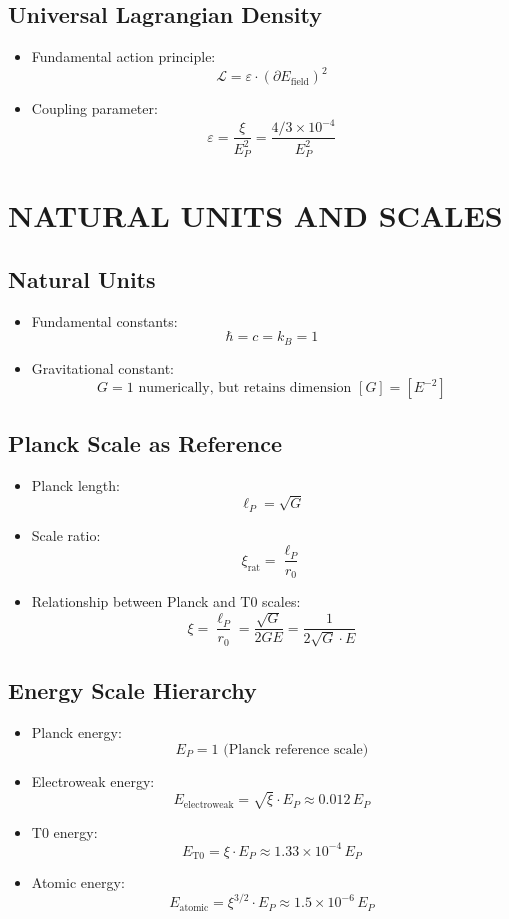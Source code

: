 \documentclass[12pt,a4paper]{article}
\begin{document}
	\subsection{Universal Lagrangian Density}
	\begin{itemize}
		\item Fundamental action principle:
		$$\boxed{\mathcal{L} = \varepsilon \cdot (\partial E_{\text{field}})^2}$$
		
		\item Coupling parameter:
		$$\varepsilon = \frac{\xi}{E_P^2} = \frac{4/3 \times 10^{-4}}{E_P^2}$$
	\end{itemize}
	
	\section{NATURAL UNITS AND SCALES}
	
	\subsection{Natural Units}
	\begin{itemize}
		\item Fundamental constants:
		$$\hbar = c = k_B = 1$$
		
		\item Gravitational constant:
		$$G = 1 \text{ numerically, but retains dimension } [G] = [E^{-2}]$$
	\end{itemize}
	
	\subsection{Planck Scale as Reference}
	\begin{itemize}
		\item Planck length:
		$$\ell_P = \sqrt{G}$$
		
		\item Scale ratio:
		$$\xi_{\text{rat}} = \frac{\ell_P}{r_0}$$
		
		\item Relationship between Planck and T0 scales:
		$$\xi = \frac{\ell_P}{r_0} = \frac{\sqrt{G}}{2GE} = \frac{1}{2\sqrt{G} \cdot E}$$
	\end{itemize}
	
	\subsection{Energy Scale Hierarchy}
	\begin{itemize}
		\item Planck energy:
		$$E_P = 1 \text{ (Planck reference scale)}$$
		
		\item Electroweak energy:
		$$E_{\text{electroweak}} = \sqrt{\xi} \cdot E_P \approx 0.012 \, E_P$$
		
		\item T0 energy:
		$$E_{\text{T0}} = \xi \cdot E_P \approx 1.33 \times 10^{-4} \, E_P$$
		
		\item Atomic energy:
		$$E_{\text{atomic}} = \xi^{3/2} \cdot E_P \approx 1.5 \times 10^{-6} \, E_P$$
	\end{itemize}
	
\end{document}
